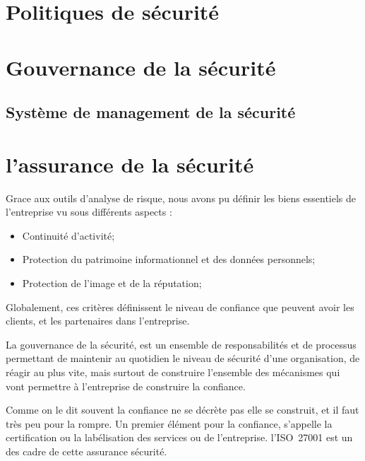 
\section{Politiques de sécurité}

\utodo

\section{Gouvernance de la sécurité}

\utodo


\subsection{Système de management de la sécurité}

\utodo


\section{l'assurance de la sécurité}

Grace aux outils d’analyse de risque, nous avons pu définir les biens essentiels de l’entreprise vu sous différents aspects :
\begin{itemize}
\item Continuité d’activité;
\item Protection du patrimoine informationnel et des données personnels;
\item Protection de l’image et de la réputation;
\end{itemize}

Globalement, ces critères définissent le niveau de confiance que peuvent avoir les clients, et les partenaires dans l’entreprise.

La gouvernance de la sécurité, est un ensemble de responsabilités et de processus permettant de maintenir au quotidien le niveau de sécurité d’une organisation, de réagir au plus vite, mais surtout de construire l’ensemble des mécanismes qui vont permettre à l’entreprise de construire la confiance.

Comme on le dit souvent la confiance ne se décrète pas elle se construit, et il faut très peu pour la rompre. Un premier élément pour la confiance, s’appelle la certification ou la labélisation des services ou de l'entreprise. l'ISO~27001 est un des cadre de cette assurance sécurité.

\utocomplete